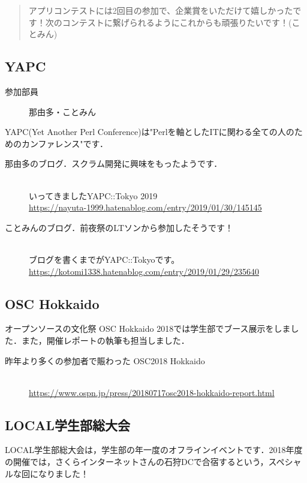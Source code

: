\begin{quotation}
アプリコンテストには2回目の参加で、企業賞をいただけて嬉しかったです！次のコンテストに繋げられるようにこれからも頑張りたいです！(ことみん)
\end{quotation}

\subsection{YAPC}
\begin{description}
\item[参加部員] 那由多・ことみん
\end{description}
YAPC(Yet Another Perl Conference)は"Perlを軸としたITに関わる全ての人のためのカンファレンス"です．\mbox{}\\

\begin{description}
\item[那由多のブログ．スクラム開発に興味をもったようです．]\mbox{}\\
いってきましたYAPC::Tokyo 2019\mbox{}\\
\url{https://nayuta-1999.hatenablog.com/entry/2019/01/30/145145}
\end{description}

\begin{description}
\item[ことみんのブログ．前夜祭のLTソンから参加したそうです！]\mbox{}\\
ブログを書くまでがYAPC::Tokyoです。\mbox{}\\
\url{https://kotomi1338.hatenablog.com/entry/2019/01/29/235640}
\end{description}

\subsection{OSC Hokkaido}
オープンソースの文化祭 OSC Hokkaido 2018では学生部でブース展示をしました．また，開催レポートの執筆も担当しました．\mbox{}\\
\begin{description}
\item[昨年より多くの参加者で賑わった OSC2018 Hokkaido]\mbox{}\\
\url{https://www.ospn.jp/press/20180717osc2018-hokkaido-report.html}
\end{description}

\subsection{LOCAL学生部総大会}
LOCAL学生部総大会は，学生部の年一度のオフラインイベントです．2018年度の開催では，さくらインターネットさんの石狩DCで合宿するという，スペシャルな回になりました！\mbox{}\\

